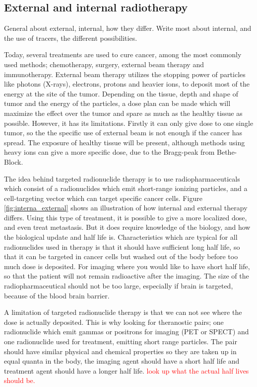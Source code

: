 \documentclass[a4paper,11pt,twoside]{book}
\begin{document}
\subsection{External and internal radiotherapy }
General about external, internal, how they differ. Write most about internal, and the use of tracers, the different possibilities. 


Today, several treatments are used to cure cancer, among the most commonly used methods; chemotherapy, surgery, external beam therapy and immunotherapy.  External beam therapy utilizes the stopping power of particles like photons (X-rays), electrons, protons and heavier ions, to deposit most of the energy at the site of the tumor. Depending on the tissue, depth and shape of tumor and the energy of the particles, a dose plan can be made which will maximize the effect over the tumor and spare as much as the healthy tissue as possible. However, it has its limitations. Firstly it can only give dose to one single tumor, so the the specific use of external beam is not enough if the cancer has spread. The exposure of healthy tissue will be present, although methods using heavy ions can give a more specific dose, due to the Bragg-peak from Bethe-Block. \newline

\noindent
The idea behind targeted radionuclide therapy is to use radiopharmaceuticals which consist of a radionuclides which emit short-range ionizing particles, and a cell-targeting vector which can target specific cancer cells. Figure \ref{fig:interna_external} shows an illustration of how internal and external therapy differs. Using this type of treatment, it is possible to give a more localized dose, and even treat metastasis. But it does require knowledge of the biology, and how the biological update and half life is. Characteristics which are typical for all radionuclides used in therapy is that it should have sufficient long half life, so that it can be targeted in cancer cells but washed out of the body before too much dose is deposited. For imaging  where you would like to have short half life, so that the patient will not remain radioactive after the imaging. The size of the radiopharmaceutical should not be too large, especially if brain is targeted, because of the blood brain barrier. 

A limitation of targeted radionuclide therapy is that we can not see where the dose is actually deposited. This is why looking for theranostic pairs; one radionuclide which emit gammas or positrons for imaging (PET or SPECT) and one radionuclide used for treatment, emitting short range particles. The pair should have similar physical and chemical properties so they are taken up in equal quanta in the body, the imaging agent should have a short half life and treatment agent should have a longer half life. \textcolor{red}{look up what the actual half lives should be.} 
\end{document}

